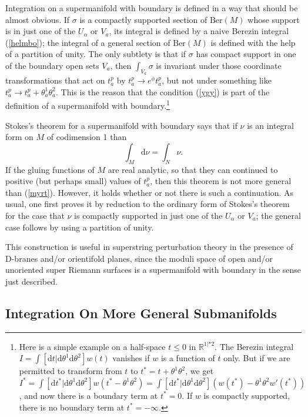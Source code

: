 \documentclass[11pt,a4paper]{article}
\def\d{{\mathrm d}}
\def\R{{\mathbb R}}
\def\Ber{{\mathrm {Ber}}}
\begin{document}
Integration on a supermanifold with boundary is defined in a way that should be almost obvious.  If $\sigma$ is a  compactly supported section of $\Ber(M)$ whose support is in just one of the
$U_\alpha$ or $V_a$, its integral is defined by a naive Berezin integral  (\ref{helmbo}); the integral of a general section of $\Ber(M)$ is defined with the help of a partition of unity.
The only subtlety is that if $\sigma$ has compact support in one of the boundary open sets $V_a$, then $\int_{V_a}\sigma$ is invariant under those coordinate transformations
that act on $t^p_a$ by $t^p_a\to e^\phi t^p_a$, but not under something like $t^p_a\to t^p_a+\theta_a^1\theta^2_a$.  
  This is the reason that the condition (\ref{ygy}) is part of the definition of a supermanifold with boundary.\footnote{Here is  a simple example on a half-space $t\leq 0$ in
   $\R^{1|*2}$.
  The Berezin integral $I=\int [\d t|\d\theta^1\d\theta^2]w(t)$  vanishes if $w$ is a function of $t$ only.  But if we are permitted to transform from $t$ to $t^*=t+\theta^1\theta^2$, we get
  $I^*=\int[\d t^*|\d\theta^1\d\theta^2]  w(t^*-\theta^1\theta^2)=\int [\d t^*|\d\theta^1\d\theta^2]\left(w(t^*)-\theta^1\theta^2 w'(t^*)\right)$, and now there is a boundary term at $t^*=0$. If
  $w$ is compactly supported, there is no boundary term at $t^*=-\infty$.}

    
Stokes's theorem for a supermanifold with boundary says that if $\nu$ is an integral form on $M$ of codimension 1 than
\begin{equation}\label{melbo}\int_M\d\nu=\int_N\nu.\end{equation}  If the gluing functions of $M$ are real analytic, so that they can continued to positive (but perhaps small) values
of $t^p_a$, then this theorem is not more general than (\ref{myrt}).  However, it holds whether or not there is such a continuation.  As usual, one first proves it by reduction to the ordinary
form of Stokes's theorem for the case that $\nu$ is compactly supported in just one of the $U_\alpha$ or $V_a$; the general case follows by using a partition of unity.

This construction is useful in superstring perturbation theory in the presence of D-branes and/or orientifold planes, since the moduli space of open and/or unoriented super Riemann
surfaces is a supermanifold with boundary in the sense just described.

\subsection{Integration On More General Submanifolds}\label{irred}
\end{document}
